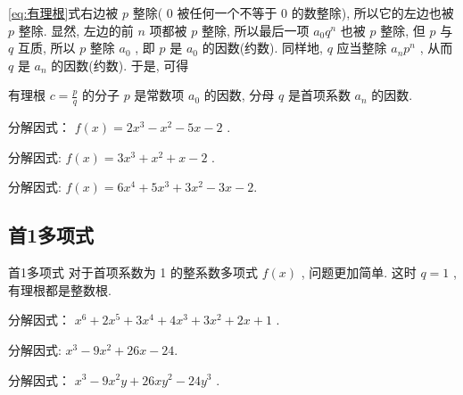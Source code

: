 \documentclass[aspectratio=169]{ctexbeamer}
\theoremstyle{definition}
\begin{document}
\begin{frame}
	\ref{eq:有理根}式右边被 $p$ 整除( 0 被任何一个不等于 0 的数整除), 所以它的左边也被 $p$ 整除. 显然, 左边的前 $n$ 项都被 $p$ 整除, 所以最后一项 $a_{0} q^{n}$ 也被 $p$ 整除, 但 $p$ 与 $q$ 互质, 所以 $p$ 整除 $a_{0}$ , 即 $p$ 是 $a_{0}$ 的因数(约数). 同样地,  $q$ 应当整除 $a_{n} p^{n}$ , 从而 $q$ 是 $a_{n}$ 的因数(约数). 于是, 可得
	\begin{block}
		有理根 $c=\frac{p}{q}$ 的分子 $p$ 是常数项 $a_{0}$ 的因数, 分母 $q$ 是首项系数 $a_{n}$ 的因数.
	\end{block}
\end{frame}

\begin{frame}[t]
	\begin{example}
		分解因式： $f(x)=2 x^{3}-x^{2}-5 x-2$ . 
	\end{example}
\end{frame}

\begin{frame}[t]
	\begin{example}
		分解因式: $f(x)=3 x^{3}+x^{2}+x-2$ . 
	\end{example}
\end{frame}

\begin{frame}[t]
	\begin{example}
		分解因式: $f(x)=6 x^{4}+5 x^{3}+3 x^{2}-3 x-2$.
	\end{example}
\end{frame}

\subsection{首1多项式}
\begin{frame}[t]{首1多项式}
	对于首项系数为 1 的整系数多项式 $f(x)$ , 问题更加简单. 这时 $q=1$ , 有理根都是整数根. 
	\begin{example}
		分解因式： $x^{6}+2 x^{5}+3 x^{4}+4 x^{3}+3 x^{2}+2 x+1$ . 
	\end{example}
\end{frame}

\begin{frame}[t]
	\begin{example}
		分解因式: $x^{3}-9 x^{2}+26 x-24$.
	\end{example}
\end{frame}

\begin{frame}[t]
	\begin{example}
		分解因式： $x^{3}-9 x^{2} y+26 x y^{2}-24 y^{3}$ . 
	\end{example}
\end{frame}
\end{document}
